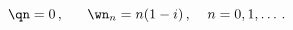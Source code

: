 \begin{equation}
\qn = 0\,, \;\;\;\;\;\; \wn_n = n (1-i)\,, \;\;\;\; n=0,1,\dots\,.
\label{vector_poles}
\end{equation}

